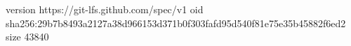 version https://git-lfs.github.com/spec/v1
oid sha256:29b7b8493a2127a38d966153d371b0f303fafd95d540f81e75e35b45882f6ed2
size 43840
